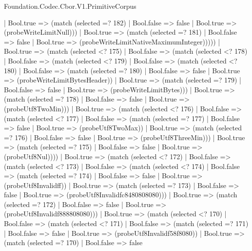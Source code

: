 \begin{lexlean}{Foundation.Codec.Cbor.V1.PrimitiveCorpus}
\begin{semanticmodule}
{                  | Bool.true => (match (selected =? 182)
                    | Bool.false => false
                    | Bool.true => (probeWriteLimitNull)))
                | Bool.true => (match (selected =? 181)
                  | Bool.false => false
                  | Bool.true => (probeWriteLimitNativeMaximumInteger)))))
          | Bool.true => (match (selected <? 175)
            | Bool.false => (match (selected <? 178)
              | Bool.false => (match (selected <? 179)
                | Bool.false => (match (selected <? 180)
                  | Bool.false => (match (selected =? 180)
                    | Bool.false => false
                    | Bool.true => (probeWriteLimitBytesHeader))
                  | Bool.true => (match (selected =? 179)
                    | Bool.false => false
                    | Bool.true => (probeWriteLimitBytes)))
                | Bool.true => (match (selected =? 178)
                  | Bool.false => false
                  | Bool.true => (probeUtf8TwoMin)))
              | Bool.true => (match (selected <? 176)
                | Bool.false => (match (selected <? 177)
                  | Bool.false => (match (selected =? 177)
                    | Bool.false => false
                    | Bool.true => (probeUtf8TwoMax))
                  | Bool.true => (match (selected =? 176)
                    | Bool.false => false
                    | Bool.true => (probeUtf8ThreeMin)))
                | Bool.true => (match (selected =? 175)
                  | Bool.false => false
                  | Bool.true => (probeUtf8Nul))))
            | Bool.true => (match (selected <? 172)
              | Bool.false => (match (selected <? 173)
                | Bool.false => (match (selected <? 174)
                  | Bool.false => (match (selected =? 174)
                    | Bool.false => false
                    | Bool.true => (probeUtf8Invalidff))
                  | Bool.true => (match (selected =? 173)
                    | Bool.false => false
                    | Bool.true => (probeUtf8Invalidfc8480808080)))
                | Bool.true => (match (selected =? 172)
                  | Bool.false => false
                  | Bool.true => (probeUtf8Invalidf888808080)))
              | Bool.true => (match (selected <? 170)
                | Bool.false => (match (selected <? 171)
                  | Bool.false => (match (selected =? 171)
                    | Bool.false => false
                    | Bool.true => (probeUtf8Invalidf58f8080))
                  | Bool.true => (match (selected =? 170)
                    | Bool.false => false
}
\end{semanticmodule}
\end{lexlean}
